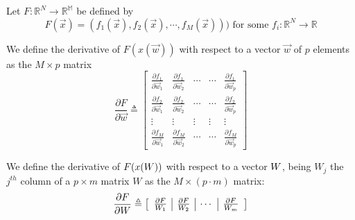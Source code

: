 
Let $F:\mathbb{R}^N \rightarrow \mathbb{R^M}$ be defined by
\begin{equation}
F(\vec{x}) = (f_1(\vec{x}),f_2(\vec{x}),\cdots,f_M(\vec{x}))) \text{    for some  } f_i:\mathbb{R}^N \rightarrow \mathbb{R}
\end{equation}

\begin{defn}
 We define the derivative of $F(x(\vec{w}))$ with respect to a vector $\vec{w}$ of $p$ elements as the $M \times p$ matrix
\begin{equation}
\frac{\partial F}{\partial \vec{w}} \triangleq
\begin{bmatrix}
   \frac{\partial f_1}{\partial \vec{w}_1}    & \frac{\partial f_1}{\partial \vec{w}_2}                & \cdots      & \cdots       & \frac{\partial f_1}{\partial \vec{w}_p}  \\
   \frac{\partial f_2}{\partial \vec{w}_1}    & \frac{\partial f_2}{\partial \vec{w}_2}                & \cdots      & \cdots       & \frac{\partial f_2}{\partial \vec{w}_p}  \\
   \vdots                & \vdots           & \vdots      & \vdots       &\vdots\\
   \frac{\partial f_M}{\partial \vec{w}_1}    & \frac{\partial f_M}{\partial \vec{w}_2}                & \cdots      & \cdots       & \frac{\partial f_M}{\partial \vec{w}_p}
\end{bmatrix}
\end{equation}
\end{defn}


\begin{defn}
We define the derivative of $F(x(W))$ with respect to a vector $W$, being $W_j$ the $j^{th}$ column of a $p\times m$ matrix $W$ as the $M\times (p \cdot m )$ matrix:
\begin{equation}
\frac{\partial F}{\partial W} \triangleq
\left[
\begin{array}{c|c|c|c}
\frac{\partial F}{W_1} & \frac{\partial F}{W_2} & \cdots & \frac{\partial F}{W_m} \\
\end{array}
\right]
\end{equation}
\end{defn}




